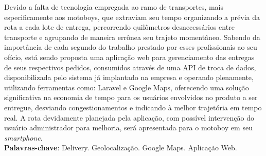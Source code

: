 
\begin{resumo}[RESUMO]
\begin{SingleSpacing}


Devido a falta de tecnologia empregada ao ramo de transportes, mais especificamente aos motoboys, que extraviam seu tempo organizando a prévia da rota a cada lote de entrega, percorrendo quilômetros desnecessários entre transporte e agrupando de maneira errônea seu trajeto momentâneo. Sabendo da importância de cada segundo do trabalho prestado por esses profissionais ao seu ofício, está sendo proposta uma aplicação web para gerenciamento das entregas de seus respectivos pedidos, consumidos através de uma API de troca de dados, disponibilizada pelo sistema já implantado na empresa e operando plenamente, utilizando ferramentas como: Laravel e Google Maps, oferecendo uma solução significativa na economia de tempo para os usuários envolvidos no produto a ser entregue, desviando congestionamentos e indicando à melhor trajetória em tempo real. A rota devidamente planejada pela aplicação, com possível intervenção do usuário administrador para melhoria, será apresentada para o motoboy em seu \textit{smartphone}.\\

\textbf{Palavras-chave}: Delivery. Geolocalização. Google Maps. Aplicação Web.

\end{SingleSpacing}
\end{resumo}